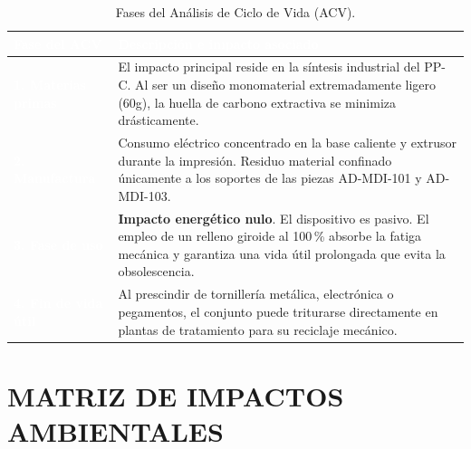 \documentclass[11pt,a4paper]{article}
\begin{document}
\begin{table}[H]
    \centering
    \small
    \renewcommand{\arraystretch}{1.6}
    \renewcommand{\tabularxcolumn}[1]{m{#1}}
    \begin{tabularx}{\linewidth}{|>{\centering\arraybackslash}m{3.5cm}|X|}
        \hline
        \rowcolor{ArthroNavy}
        \textcolor{white}{\textbf{Fase del ACV}} & 
        \textcolor{white}{\textbf{Descripción e impacto asociado}} \\ 
        \hline
        
        \cellcolor{ArthroNavy}\textcolor{white}{\textbf{1. Materias primas}} & 
        \cellcolor{ArthroTeal!5}
        El impacto principal reside en la síntesis industrial del PP-C. Al ser un diseño monomaterial extremadamente ligero (60g), la huella de carbono extractiva se minimiza drásticamente. \\ 
        \hline
        
        \cellcolor{ArthroNavy}\textcolor{white}{\textbf{2. Manufactura}} & 
        Consumo eléctrico concentrado en la base caliente y extrusor durante la impresión. Residuo material confinado únicamente a los soportes de las piezas AD-MDI-101 y AD-MDI-103. \\ 
        \hline
        
        \cellcolor{ArthroNavy}\textcolor{white}{\textbf{3. Fase de uso}} & 
        \cellcolor{ArthroTeal!5}
        \textbf{Impacto energético nulo}. El dispositivo es pasivo. El empleo de un relleno giroide al 100\,\% absorbe la fatiga mecánica y garantiza una vida útil prolongada que evita la obsolescencia. \\ 
        \hline
        
        \cellcolor{ArthroNavy}\textcolor{white}{\textbf{4. Fin de vida útil}} & 
        Al prescindir de tornillería metálica, electrónica o pegamentos, el conjunto puede triturarse directamente en plantas de tratamiento para su reciclaje mecánico. \\ 
        \hline
    \end{tabularx}
    \caption{Fases del Análisis de Ciclo de Vida (ACV).}
    \label{tab:fases_acv}
\end{table}



\section{MATRIZ DE IMPACTOS AMBIENTALES}
\end{document}
